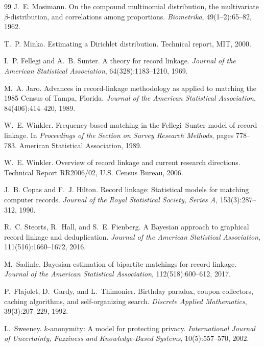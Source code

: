 \documentclass[11pt]{article}
\newcommand{\1}{\mathbf{1}}
\theoremstyle{plain}
\theoremstyle{definition}
\begin{document}
\begin{thebibliography}{99}
J.~E. Mosimann.
\newblock On the compound multinomial distribution, the multivariate $\beta$-distribution,
  and correlations among proportions.
\newblock \emph{Biometrika}, 49(1--2):65--82, 1962.

T.~P. Minka.
\newblock Estimating a {D}irichlet distribution.
\newblock Technical report, MIT, 2000.

I.~P. Fellegi and A.~B. Sunter.
\newblock A theory for record linkage.
\newblock \emph{Journal of the American Statistical Association}, 64(328):1183--1210, 1969.

M.~A. Jaro.
\newblock Advances in record-linkage methodology as applied to matching the 1985 Census of {T}ampa, {F}lorida.
\newblock \emph{Journal of the American Statistical Association}, 84(406):414--420, 1989.

W.~E. Winkler.
\newblock Frequency-based matching in the {F}ellegi--{S}unter model of record linkage.
\newblock In \emph{Proceedings of the Section on Survey Research Methods},
  pages 778--783. American Statistical Association, 1989.

W.~E. Winkler.
\newblock Overview of record linkage and current research directions.
\newblock Technical Report RR2006/02, U.S. Census Bureau, 2006.

J.~B. Copas and F.~J. Hilton.
\newblock Record linkage: Statistical models for matching computer records.
\newblock \emph{Journal of the Royal Statistical Society, Series A}, 153(3):287--312, 1990.

R.~C. Steorts, R.~Hall, and S.~E. Fienberg.
\newblock A {B}ayesian approach to graphical record linkage and deduplication.
\newblock \emph{Journal of the American Statistical Association}, 111(516):1660--1672, 2016.

M.~Sadinle.
\newblock Bayesian estimation of bipartite matchings for record linkage.
\newblock \emph{Journal of the American Statistical Association}, 112(518):600--612, 2017.

P.~Flajolet, D.~Gardy, and L.~Thimonier.
\newblock Birthday paradox, coupon collectors, caching algorithms, and self-organizing search.
\newblock \emph{Discrete Applied Mathematics}, 39(3):207--229, 1992.

L.~Sweeney.
\newblock $k$-anonymity: A model for protecting privacy.
\newblock \emph{International Journal of Uncertainty, Fuzziness and Knowledge-Based Systems}, 10(5):557--570, 2002.


\end{thebibliography}
\end{document}
